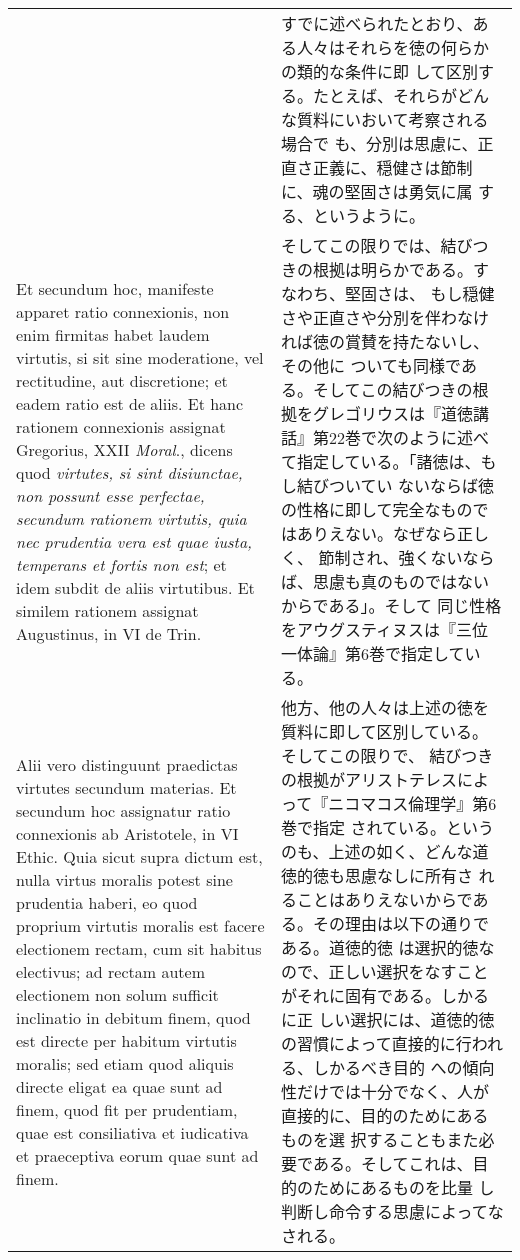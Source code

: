 \documentclass[10pt]{jsarticle}
\begin{document}
\begin{longtable}{p{21em}p{21em}}
 &

 すでに述べられたとおり、ある人々はそれらを徳の何らかの類的な条件に即
 して区別する。たとえば、それらがどんな質料にいおいて考察される場合で
 も、分別は思慮に、正直さ正義に、穏健さは節制に、魂の堅固さは勇気に属
 する、というように。


\\

 Et secundum hoc, manifeste apparet ratio connexionis, non enim
 firmitas habet laudem virtutis, si sit sine moderatione, vel
 rectitudine, aut discretione; et eadem ratio est de aliis. Et hanc
 rationem connexionis assignat Gregorius, XXII {\itshape Moral}.,
 dicens quod {\itshape virtutes, si sint disiunctae, non possunt esse
 perfectae, secundum rationem virtutis, quia nec prudentia vera est
 quae iusta, temperans et fortis non est}; et idem subdit de aliis
 virtutibus. Et similem rationem assignat Augustinus, in VI de Trin.

&

 そしてこの限りでは、結びつきの根拠は明らかである。すなわち、堅固さは、
 もし穏健さや正直さや分別を伴わなければ徳の賞賛を持たないし、その他に
 ついても同様である。そしてこの結びつきの根拠をグレゴリウスは『道徳講
 話』第22巻で次のように述べて指定している。「諸徳は、もし結びついてい
 ないならば徳の性格に即して完全なものではありえない。なぜなら正しく、
 節制され、強くないならば、思慮も真のものではないからである」。そして
 同じ性格をアウグスティヌスは『三位一体論』第6巻で指定している。

\\


 Alii vero distinguunt praedictas virtutes secundum materias. Et
 secundum hoc assignatur ratio connexionis ab Aristotele, in VI
 Ethic. Quia sicut supra dictum est, nulla virtus moralis potest sine
 prudentia haberi, eo quod proprium virtutis moralis est facere
 electionem rectam, cum sit habitus electivus; ad rectam autem
 electionem non solum sufficit inclinatio in debitum finem, quod est
 directe per habitum virtutis moralis; sed etiam quod aliquis directe
 eligat ea quae sunt ad finem, quod fit per prudentiam, quae est
 consiliativa et iudicativa et praeceptiva eorum quae sunt ad finem.

&

 他方、他の人々は上述の徳を質料に即して区別している。そしてこの限りで、
 結びつきの根拠がアリストテレスによって『ニコマコス倫理学』第6巻で指定
 されている。というのも、上述の如く、どんな道徳的徳も思慮なしに所有さ
 れることはありえないからである。その理由は以下の通りである。道徳的徳
 は選択的徳なので、正しい選択をなすことがそれに固有である。しかるに正
 しい選択には、道徳的徳の習慣によって直接的に行われる、しかるべき目的
 への傾向性だけでは十分でなく、人が直接的に、目的のためにあるものを選
 択することもまた必要である。そしてこれは、目的のためにあるものを比量
 し判断し命令する思慮によってなされる。
 


\end{longtable}
\end{document}
